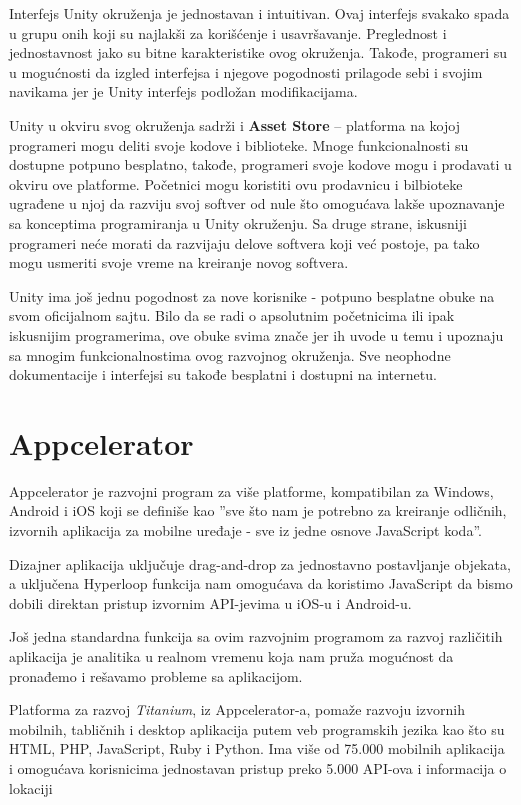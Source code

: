 \documentclass[12pt]{article}
\begin{document}
Interfejs Unity okruženja je jednostavan i intuitivan. 
Ovaj interfejs svakako spada u grupu onih koji su najlakši za korišćenje i usavršavanje. Preglednost i jednostavnost jako su bitne karakteristike
ovog okruženja. Takođe, programeri su u mogućnosti da izgled interfejsa i njegove pogodnosti prilagode sebi i svojim navikama jer je Unity interfejs
podložan modifikacijama. 

Unity u okviru svog okruženja sadrži i \textbf{Asset Store} – platforma na kojoj programeri mogu deliti svoje kodove i biblioteke. Mnoge funkcionalnosti su dostupne potpuno besplatno, takođe, programeri svoje kodove mogu i prodavati u okviru ove platforme. Početnici mogu koristiti ovu prodavnicu i bilbioteke ugrađene u njoj da razviju svoj softver od nule što omogućava lakše upoznavanje sa konceptima programiranja u Unity okruženju.
Sa druge strane, iskusniji programeri neće morati da razvijaju delove softvera koji već postoje, pa tako mogu usmeriti svoje vreme na kreiranje novog softvera.

Unity ima još jednu pogodnost za nove korisnike - potpuno besplatne obuke na svom oficijalnom sajtu.
Bilo da se radi o apsolutnim početnicima ili ipak iskusnijim programerima, ove obuke svima znače jer ih uvode u temu i upoznaju sa mnogim funkcionalnostima ovog razvojnog okruženja.
Sve neophodne dokumentacije i interfejsi su takođe besplatni i dostupni na internetu.

\section{Appcelerator}
Appcelerator je razvojni program za više platforme, kompatibilan za Windows, Android i iOS koji se definiše kao  ''sve što nam je potrebno za kreiranje odličnih, izvornih aplikacija za mobilne uređaje - sve iz jedne osnove JavaScript koda''.

Dizajner aplikacija uključuje drag-and-drop za jednostavno postavljanje objekata, a uključena Hyperloop funkcija nam omogućava da koristimo JavaScript da bismo dobili direktan pristup izvornim API-jevima u iOS-u i Android-u.

Još jedna standardna funkcija sa ovim razvojnim programom za razvoj različitih aplikacija je analitika u realnom vremenu koja nam pruža mogućnost da pronađemo i rešavamo probleme sa aplikacijom.

Platforma za razvoj \textit{Titanium}, iz Appcelerator-a, pomaže razvoju izvornih mobilnih, tabličnih i desktop aplikacija putem veb programskih jezika kao što su HTML, PHP, JavaScript, Ruby i Python. Ima više od 75.000 mobilnih aplikacija i omogućava korisnicima jednostavan pristup preko 5.000 API-ova i informacija o lokaciji
\end{document}
